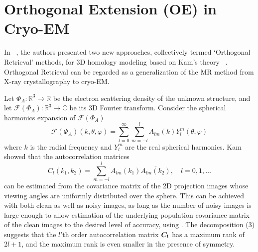 \section{Orthogonal Extension (OE) in Cryo-EM}
\label{sec:oe}
In ~\cite{Bhamre2014}, the authors presented two new approaches, collectively 
termed `Orthogonal Retrieval' methods, for 3D homology modeling based on Kam's theory ~\cite{kam1980}. Orthogonal Retrieval can be 
regarded as a generalization of the MR method from X-ray
crystallography to cryo-EM. 

Let $\Phi_A: \mathbb{R}^3 \rightarrow \mathbb{R}$ be the electron scattering 
density of the unknown structure, and let $\mathcal{F}(\Phi_A) : \mathbb{R}^3 
\to
\mathbb{C}$ be its 3D Fourier
transform. Consider the spherical harmonics expansion of $\mathcal{F}(\Phi_A)$
\begin{equation}
\label{eq:phia_expansion_full}
\mathcal{F}(\Phi_A)(k,\theta,\varphi) = \sum_{l=0}^{\infty} \sum_{m=-l}^{l} 
A_{lm}(k)
Y_l^m
(\theta, \varphi)
\end{equation}
where $k$ is the radial frequency and $Y_l^m$ are the real spherical
harmonics. Kam showed that the autocorrelation matrices 
\begin{equation}
\label{eq:Cl}
C_{{l}}(k_1,k_2) = \sum_{m=-l}^l A_{lm}(k_1)\overline{A_{lm}(k_2)}, \quad 
l=0,1,\ldots
\end{equation}
can be estimated from the covariance matrix of the 2D projection images whose 
viewing angles are uniformly distributed over the sphere.  This can be achieved with both clean as well as noisy images, as 
long as the number of noisy images is large enough to allow estimation of the 
underlying population covariance matrix of the clean images to the desired 
level of accuracy, using \cite{Bhamre2016}. The decomposition (3) suggests that the $l$'th order autocorrelation matrix $\boldsymbol{C}_{\boldsymbol{l}}$ has a maximum rank of $2l+1$, and the maximum rank is even smaller in the presence of symmetry. 

